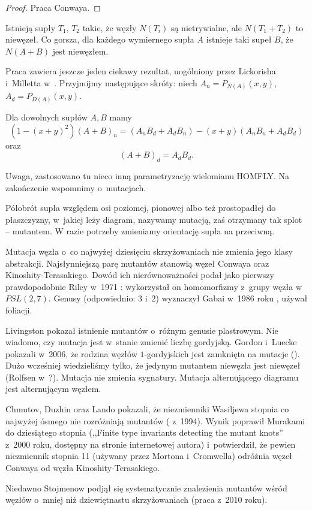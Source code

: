 \begin{proof}
    Praca \cite{conway70} Conwaya.
\end{proof}

Istnieją supły $T_1$, $T_2$ takie, że węzły $N(T_i)$ są nietrywialne, ale $N(T_1 + T_2)$ to niewęzeł.
Co gorsza, dla każdego wymiernego supła $A$ istnieje taki supeł $B$, że $N(A+B)$ jest niewęzłem.

Praca \cite{conway70} zawiera jeszcze jeden ciekawy rezultat, uogólniony przez Lickorisha i~Milletta w~\cite{lickorish87}.
Przyjmijmy następujące skróty: niech $A_n = P_{N(A)}(x,y)$, $A_d = P_{D(A)}(x,y)$.

\begin{proposition}
    Dla dowolnych supłów $A, B$ mamy
    \[
    (1 - (x+y)^2)(A+B)_n = (A_nB_d + A_dB_n) - (x+y)(A_nB_n+  A_dB_d)
    \]
    oraz
    \[
        (A+B)_d = A_dB_d.
    \]
\end{proposition}

Uwaga, zastosowano tu nieco inną parametryzację wielomianu HOMFLY.
Na zakończenie wspomnimy o~mutacjach.

\begin{definition}[mutacja]
\label{def:mutant}
    Półobrót supła względem osi poziomej, pionowej albo też prostopadłej do płaszczyzny, w~jakiej leży diagram, nazywamy mutacją, zaś otrzymany tak splot -- mutantem.
    W razie potrzeby zmieniamy orientację supła na przeciwną.
\end{definition}

Mutacja węzła o~co najwyżej dziesięciu skrzyżowaniach nie zmienia jego klasy abstrakcji.
Najsłynniejszą parę mutantów stanowią węzeł Conwaya oraz Kinoshity-Terasakiego.
Dowód ich nierównoważności podał jako pierwszy prawdopodobnie Riley w~1971 \cite{riley71}:
wykorzystał on homomorfizmy z~grupy węzła w~$PSL(2, 7)$.
Genusy (odpowiednio: $3$ i~$2$) wyznaczył Gabai w~1986 roku \cite{gabai86}, używał foliacji.

Livingston pokazał istnienie mutantów o~różnym genusie plastrowym.
Nie wiadomo, czy mutacja jest w~stanie zmienić liczbę gordyjską.
Gordon i~Luecke pokazali w~2006, że rodzina węzłów $1$-gordyjskich jest zamknięta na mutacje (\cite{gordon06}).
Dużo wcześniej wiedzieliśmy tylko, że jedynym mutantem niewęzła jest niewęzeł (Rolfsen w~\cite{rolfsen93}?).
Mutacja nie zmienia sygnatury.
Mutacja alternującego diagramu jest alternującym węzłem.

Chmutov, Duzhin oraz Lando pokazali, że niezmienniki Wasiljewa stopnia co najwyżej ósmego nie rozróżniają mutantów (\cite{chmutov94} z~1994).
Wynik poprawił Murakami do dziesiątego stopnia (,,Finite type invariants detecting the mutant knots'' z~2000 roku, dostępny na stronie internetowej autora) i~potwierdził, że pewien niezmiennik stopnia 11 (używany przez Mortona i~Cromwella) odróżnia węzeł Conwaya od węzła Kinoshity-Terasakiego.

Niedawno Stojmenow podjął się systematycznie znalezienia mutantów wśród węzłów o~mniej niż dziewiętnastu skrzyżowaniach (praca \cite{stoimenow10} z~2010 roku).



